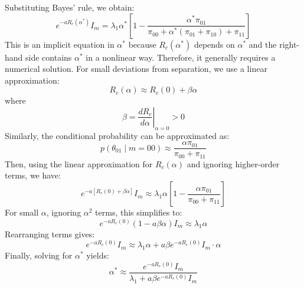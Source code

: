 \documentclass[sigconf,review]{acmart}
\begin{document}
Substituting Bayes' rule, we obtain:
\begin{equation}
e^{-a R_c(\alpha^*)} I_m = \lambda_1 \alpha^* \left[ 1 - \frac{\alpha^* \pi_{01}}{\pi_{00} + \alpha^*(\pi_{01} + \pi_{10}) + \pi_{11}} \right]
\end{equation}
This is an implicit equation in $\alpha^*$ because $R_c(\alpha^*)$ depends on $\alpha^*$ and the right-hand side contains $\alpha^*$ in a nonlinear way. Therefore, it generally requires a numerical solution. For small deviations from separation, we use a linear approximation:
\begin{equation}
R_c(\alpha) \approx R_c(0) + \beta \alpha
\end{equation}
where
\begin{equation}
\beta = \left. \frac{d R_c}{d \alpha} \right|_{\alpha = 0} > 0
\end{equation}
Similarly, the conditional probability can be approximated as:
\begin{equation}
p(\theta_{01} \mid m = 00) \approx \frac{\alpha \pi_{01}}{\pi_{00} + \pi_{11}}
\end{equation}
Then, using the linear approximation for $R_c(\alpha)$ and ignoring higher-order terms, we have:
\begin{equation}
e^{-a [R_c(0) + \beta \alpha]} I_m \approx \lambda_1 \alpha \left[ 1 - \frac{\alpha \pi_{01}}{\pi_{00} + \pi_{11}} \right]
\end{equation}
For small $\alpha$, ignoring $\alpha^2$ terms, this simplifies to:
\begin{equation}
e^{-a R_c(0)} (1 - a \beta \alpha) I_m \approx \lambda_1 \alpha
\end{equation}
Rearranging terms gives:
\begin{equation}
e^{-a R_c(0)} I_m \approx \lambda_1 \alpha + a \beta e^{-a R_c(0)} I_m \cdot \alpha
\end{equation}
Finally, solving for $\alpha^*$ yields:
\begin{equation}
\alpha^* \approx \frac{e^{-a R_c(0)} I_m}{\lambda_1 + a \beta e^{-a R_c(0)} I_m}
\end{equation}
\end{document}
